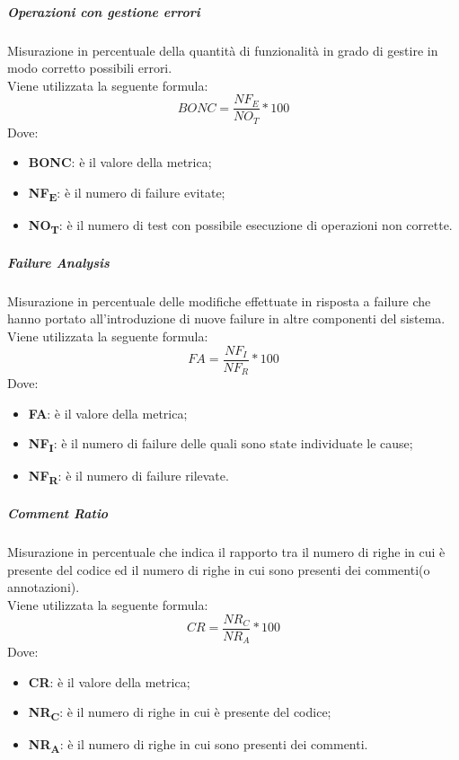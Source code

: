 \subparagraph{Operazioni con gestione errori}\Spazio
Misurazione in percentuale della quantità di funzionalità in grado di gestire in modo corretto possibili errori.\\
Viene utilizzata la seguente formula:
$$BONC=\frac{NF_E}{NO_T}*100$$
Dove:
\begin{itemize}
	\item{\textbf{BONC}: è il valore della metrica;}
	\item{\textbf{NF\textsubscript{E}}: è il numero di failure evitate;}
	\item{\textbf{NO\textsubscript{T}}: è il numero di test con possibile esecuzione di operazioni non corrette.}
\end{itemize}

\subparagraph{Failure Analysis}\Spazio
Misurazione in percentuale delle modifiche effettuate in risposta a failure che hanno portato all'introduzione di nuove failure in altre componenti del sistema. \\
Viene utilizzata la seguente formula:
$$FA=\frac{NF_I}{NF_R}*100$$
Dove:
\begin{itemize}
	\item{\textbf{FA}: è il valore della metrica;}
	\item{\textbf{NF\textsubscript{I}}: è il numero di failure delle quali sono state individuate le cause;}
	\item{\textbf{NF\textsubscript{R}}: è il numero di failure rilevate.}
\end{itemize}

\subparagraph{Comment Ratio}\Spazio
Misurazione in percentuale che indica il rapporto tra il numero di righe in cui è presente del codice ed il numero di righe in cui sono presenti dei commenti(o annotazioni). \\
Viene utilizzata la seguente formula:
$$CR=\frac{NR_C}{NR_A}*100$$
Dove:
\begin{itemize}
	\item{\textbf{CR}: è il valore della metrica;}
	\item{\textbf{NR\textsubscript{C}}: è il numero di righe in cui è presente del codice;}
	\item{\textbf{NR\textsubscript{A}}: è il numero di righe in cui sono presenti dei commenti.}
\end{itemize}

\pagebreak
